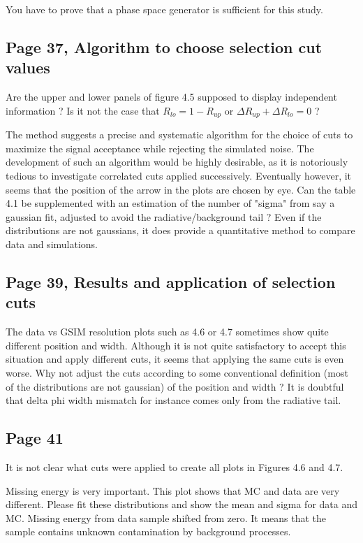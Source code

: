 \documentclass[11pt]{paper}
\begin{document}
You have to prove that a phase space generator is sufficient for this study. 

\subsection*{Page 37, Algorithm to choose selection cut values}
Are the upper and lower panels of figure 4.5 supposed to display independent information ?
Is it not the case that $R_{lo} = 1-R_{up}$ or $\Delta R_{up} + \Delta R_{lo} = 0$ ?

The method suggests a precise and systematic algorithm for the choice of cuts to maximize the signal acceptance while rejecting the simulated noise.
The development of such an algorithm would be highly desirable, as it is notoriously tedious to investigate correlated cuts applied successively.
Eventually however, it seems that the position of the arrow in the plots are chosen by eye.
Can the table 4.1 be supplemented with an estimation of the number of "sigma" from say a gaussian fit, adjusted to avoid the radiative/background tail ?
Even if the distributions are not gaussians, it does provide a quantitative method to compare data and simulations.

\subsection*{Page 39, Results and application of selection cuts}

The data vs GSIM resolution plots such as 4.6 or 4.7 sometimes show quite different position and width.
Although it is not quite satisfactory to accept this situation and apply different cuts, it seems that applying the same cuts is even worse.
Why not adjust the cuts according to some conventional definition (most of the distributions are not gaussian) of the position and width ?
It is doubtful that delta phi width mismatch for instance comes only from the radiative tail.

\subsection*{Page 41} 
It is not clear what cuts were applied to create all plots in Figures 4.6 and 4.7.

Missing energy is very important. This plot shows that MC and data are very different. 
Please fit these distributions and show the mean and sigma for data and MC. Missing energy from data sample shifted from zero. 
It means that the sample contains unknown contamination by background processes.
\end{document}
